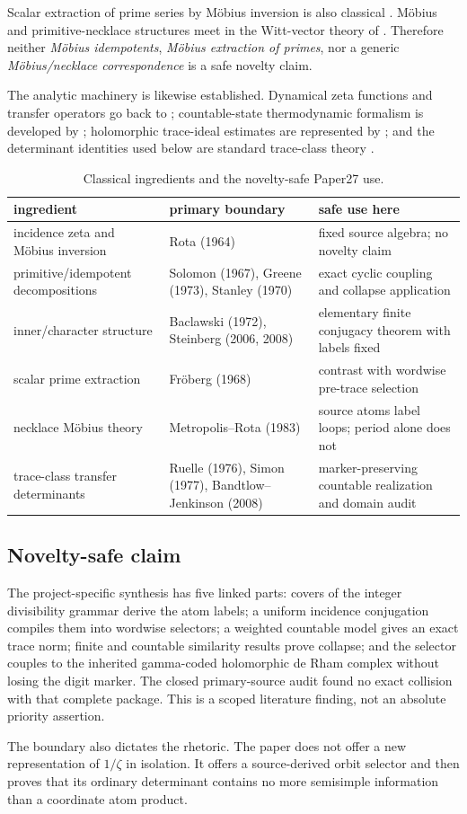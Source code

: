 Scalar extraction of prime series by Möbius inversion is also classical
\citep{froberg1968prime}. Möbius and primitive-necklace structures meet in
the Witt-vector theory of \citet{metropolis1983witt}. Therefore neither
\emph{Möbius idempotents}, \emph{Möbius extraction of primes}, nor a generic
\emph{Möbius/necklace correspondence} is a safe novelty claim.

The analytic machinery is likewise established. Dynamical zeta functions
and transfer operators go back to \citet{ruelle1976zeta}; countable-state
thermodynamic formalism is developed by \citet{sarig1999thermodynamic};
holomorphic trace-ideal estimates are represented by
\citet{bandtlow2008eigenvalue}; and the determinant identities used below are
standard trace-class theory \citep{simon1977determinants}.

\begin{table}[t]
\centering
\small
\caption{Classical ingredients and the novelty-safe Paper27 use.}
\label{tab:literature-boundary}
\begin{tabularx}{\textwidth}{L{38mm} L{39mm} Y}
\toprule
ingredient & primary boundary & safe use here \\
\midrule
incidence zeta and Möbius inversion
& Rota (1964)
& fixed source algebra; no novelty claim \\
primitive/idempotent decompositions
& Solomon (1967), Greene (1973), Stanley (1970)
& exact cyclic coupling and collapse application \\
inner/character structure
& Baclawski (1972), Steinberg (2006, 2008)
& elementary finite conjugacy theorem with labels fixed \\
scalar prime extraction
& Fröberg (1968)
& contrast with wordwise pre-trace selection \\
necklace Möbius theory
& Metropolis--Rota (1983)
& source atoms label loops; period alone does not \\
trace-class transfer determinants
& Ruelle (1976), Simon (1977), Bandtlow--Jenkinson (2008)
& marker-preserving countable realization and domain audit \\
\bottomrule
\end{tabularx}
\end{table}

\subsection{Novelty-safe claim}

The project-specific synthesis has five linked parts: covers of the integer
divisibility grammar derive the atom labels; a uniform incidence conjugation
compiles them into wordwise selectors; a weighted countable model gives an
exact trace norm; finite and countable similarity results prove collapse; and
the selector couples to the inherited gamma-coded holomorphic de Rham complex
without losing the digit marker. The closed primary-source audit found no
exact collision with that complete package. This is a scoped literature
finding, not an absolute priority assertion.

The boundary also dictates the rhetoric. The paper does not offer a new
representation of \(1/\zeta\) in isolation. It offers a source-derived orbit
selector and then proves that its ordinary determinant contains no more
semisimple information than a coordinate atom product.

